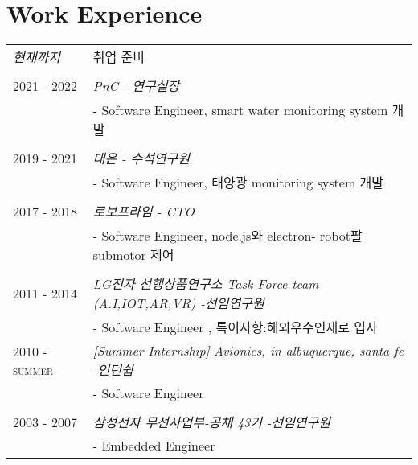 \documentclass[a4paper,10pt]{article} %
\begin{document}
\section{Work Experience}
\begin{tabular}{l|p{11cm}}
  \emph{현재까지} & 취업 준비\\
  \multicolumn{2}{c}{} \\
  \setstretch{1.0}

\textsc{2021 - 2022} & \emph{ PnC - 연구실장 }\\ 
& \footnotesize{- Software Engineer, smart water monitoring system 개발 }\\
\multicolumn{2}{c}{} \\
  
\textsc{2019 - 2021} & \emph{ 대은 - 수석연구원}\\ 
& \footnotesize{- Software Engineer, 태양광 monitoring system 개발}\\
\multicolumn{2}{c}{} \\
  
\textsc{2017 - 2018} & \emph{로보프라임 - CTO}\\ 
& \footnotesize{- Software Engineer, node.js와 electron- robot팔 submotor 제어}\\
\multicolumn{2}{c}{} \\
  
\textsc{2011 - 2014} & \emph{LG전자 선행상품연구소 Task-Force team (A.I,IOT,AR,VR) -선임연구원}\\ 
& \footnotesize{- Software Engineer , 특이사항:해외우수인재로 입사}
\multicolumn{2}{c}{} \\

\textsc{2010 - summer} & \textit{[Summer Internship]}  \emph{Avionics, in albuquerque, santa fe -인턴쉽}\\
& \footnotesize{- Software Engineer}\\
\multicolumn{2}{c}{} \\

\textsc{2003 - 2007} & \emph{삼성전자 무선사업부-공채 43기 -선임연구원}\\
& \footnotesize{- Embedded Engineer}\\
\end{tabular}
\end{document}

